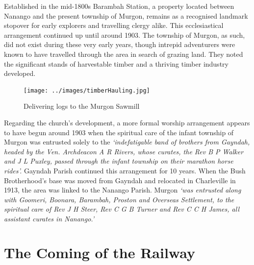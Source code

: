 Established in the mid-1800s Barambah Station, a property located between Nanango and the present township of Murgon, remains as a recognised landmark stopover for early explorers and travelling clergy alike. This ecclesiastical arrangement continued up until around 1903. The township of Murgon, as such, did not exist during these very early years, though intrepid adventurers were known to have travelled through the area in search of grazing land. They noted the significant stands of harvestable timber and a thriving timber industry developed.









\begin{figure}
\begin{center}
\texttt{[image: ../images/timberHauling.jpg]}
\caption{Delivering logs to the Murgon Sawmill}
\end{center}
\end{figure}




Regarding the church's development, a more formal worship arrangement appears to have begun around 1903 when the spiritual care of the infant township of Murgon was entrusted solely to the \emph{`indefatigable band of brothers from Gayndah, headed by the Ven. Archdeacon A R Rivers, whose curates, the Rev B P Walker and J L Puxley, passed through the infant township on their marathon horse rides'.} Gayndah Parish continued this arrangement for 10 years. When the Bush Brotherhood's base was moved from Gayndah and relocated in Charleville in 1913, the area was linked to the Nanango Parish. Murgon \emph{`was entrusted along with Goomeri, Boonara, Barambah, Proston and Overseas Settlement, to the spiritual care of Rev J H Steer, Rev C G B Turner and Rev C C H James, all assistant curates in Nanango.'}



\section{The Coming of the Railway}



